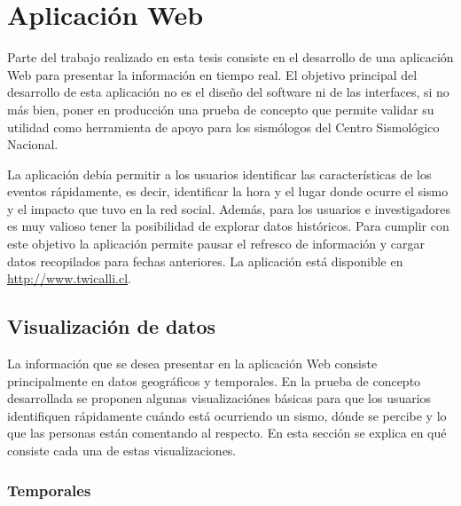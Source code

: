 \chapter{Aplicación Web}
\label{cap:aplicacion}

Parte del trabajo realizado en esta tesis consiste en el desarrollo de una aplicación Web para presentar la información en tiempo real. 
%
El objetivo principal del desarrollo de esta aplicación no es el diseño del software ni de las interfaces, si no más bien, poner en producción una prueba de concepto que permite validar su utilidad como herramienta de apoyo para los sismólogos del Centro Sismológico Nacional.


La aplicación debía permitir a los usuarios identificar las características de los eventos rápidamente, es decir, identificar la hora y el lugar donde ocurre el sismo y el impacto que tuvo en la red social.
%
Además, para los usuarios e investigadores es muy valioso tener la posibilidad de explorar datos históricos. Para cumplir con este objetivo la aplicación permite pausar el refresco de información y cargar datos recopilados para fechas anteriores.  
%
La aplicación está disponible en \url{http://www.twicalli.cl}.


\section{Visualización de datos}
\label{sec:visualizacion}

La información que se desea presentar en la aplicación Web consiste principalmente en datos geográficos y temporales. 
%
En la prueba de concepto desarrollada se proponen algunas visualizaciónes básicas para que los usuarios identifiquen rápidamente cuándo está ocurriendo un sismo, dónde se percibe y lo que las personas están comentando al respecto.
%
En esta sección se explica en qué consiste cada una de estas visualizaciones.


	\subsection{Temporales}
	

